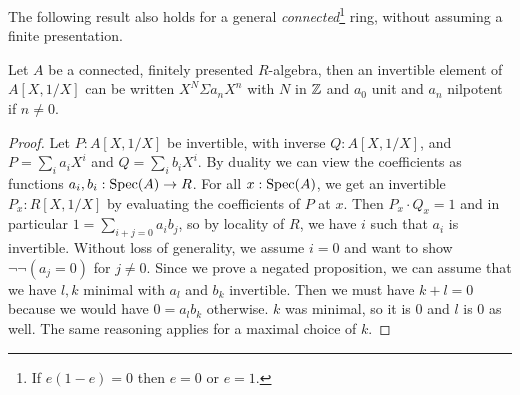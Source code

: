 



 The following result also holds for a general \emph{connected}\footnote{If $e(1-e) = 0$ then $e=0$ or $e=1$.} ring,
 without assuming a finite presentation. 

 \begin{lemma}\label{stand}
   Let $A$ be a connected, finitely presented $R$-algebra, then
   an invertible element of $A[X,1/X]$ can be written $X^N\Sigma a_nX^n$ with $N$ in $\mathbb{Z}$
   and $a_0$ unit and $a_n$ nilpotent if $n\neq 0$.
 \end{lemma}

 \begin{proof}
   Let $P:A[X,1/X]$ be invertible, with inverse $Q:A[X,1/X]$, and $P=\sum_ia_iX^i$ and $Q=\sum_ib_iX^i$.
   By duality we can view the coefficients as functions $a_i,b_i:\operatorname{Spec}(A)\to R$.
   For all $x:\operatorname{Spec}(A)$, we get an invertible $P_x:R[X,1/X]$ by evaluating the coefficients of $P$ at $x$.
   Then $P_x\cdot Q_x=1$ and in particular $1=\sum_{i+j=0}a_ib_j$, so by locality of $R$, we have $i$ such that $a_i$ is invertible.
   Without loss of generality, we assume $i=0$ and want to show $\neg\neg (a_j=0)$ for $j\neq 0$.
   Since we prove a negated proposition, we can assume that we have $l,k$ minimal with $a_l$ and $b_k$ invertible.
   Then we must have $k+l=0$ because we would have $0=a_lb_k$ otherwise.
   $k$ was minimal, so it is $0$ and $l$ is $0$ as well.
   The same reasoning applies for a maximal choice of $k$.
 \end{proof}
 
